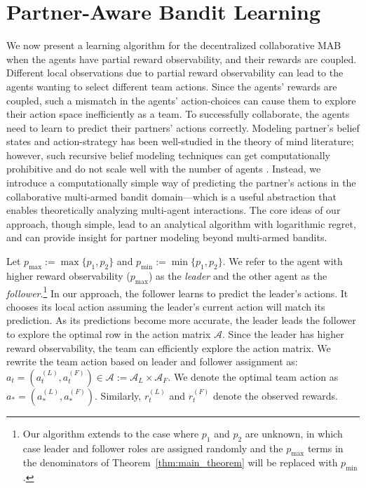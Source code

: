 \documentclass[letterpaper]{article} %
\theoremstyle{definition}
\def\mc{\mathcal}
\begin{document}
\section{Partner-Aware Bandit Learning}

We now present a learning algorithm for the decentralized collaborative MAB when the agents have partial reward observability, and their rewards are coupled.
Different local observations due to partial reward observability can lead to the agents wanting to select different team actions. Since the agents' rewards are coupled, such a mismatch in the agents' action-choices can cause them to explore their action space inefficiently as a team. To successfully collaborate, the agents need to learn to predict their partners' actions correctly. Modeling partner's belief states and action-strategy has been well-studied in the theory of mind literature; however, such recursive belief modeling techniques can get computationally prohibitive and do not scale well with the number of agents \cite{hellstrom2018understandable}. Instead, we introduce a computationally simple way of predicting the partner's actions in the collaborative multi-armed bandit domain---which is a useful abstraction that enables theoretically analyzing multi-agent interactions. The core ideas of our approach, though simple, lead to an analytical algorithm with logarithmic regret, and can provide insight for partner modeling beyond multi-armed bandits.

Let $p_{\text{max}} := \max\{p_1, p_2\}$ and $p_{\text{min}} := \min\{p_1, p_2\}$. We refer to the agent with higher reward observability ($p_{\text{max}}$) as the \textit{leader} and the other agent as the  \textit{follower}.\footnote{Our algorithm extends to the case where $p_1$ and $p_2$ are unknown, in which case leader and follower roles are assigned randomly and the $p_{\text{max}}$ terms in the denominators of Theorem~\ref{thm:main_theorem} will be replaced with $p_{\text{min}}$.} In our approach, the follower learns to predict the leader's actions. It chooses its local action assuming the leader's current action will match its prediction. As its predictions become more accurate, the leader leads the follower to explore the optimal row in the action matrix $\mc{A}$. Since the leader has higher reward observability, the team can efficiently explore the action matrix.
We rewrite the team action based on leader and follower assignment as:
$a_t \!=\! (a^{(L)}_t, a^{(F)}_t) \!\in\! \mc{A}\!:=\! \mc{A}_L\!\times\mc{A}_F$. We denote the optimal team action as $a_{\ast} = (a^{(L)}_{\ast}, a^{(F)}_{\ast})$. Similarly, $r^{(L)}_t$ and $r^{(F)}_t$ denote the observed rewards. %
\end{document}
